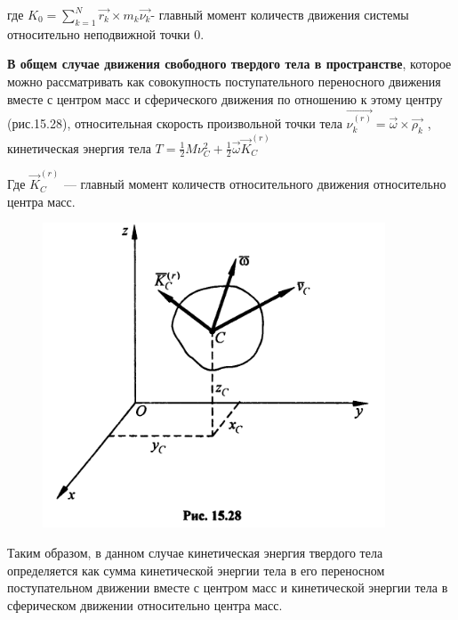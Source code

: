{\begin{center}
    \par где $ K_{0} = \sum_{k=1}^{N} \vec{r_{k}} \times m_{k}\vec{\nu_{k}}  $- главный момент количеств движения системы относительно неподвижной точки 0.

    \par \textbf {В  общем  случае  движения  свободного  твердого  тела  в  пространстве}, которое можно рассматривать как совокупность поступательного переносного движения вместе с центром масс и сферического движения по отношению к этому центру (рис.15.28), относительная скорость произвольной точки тела $\vec{\nu_{k}^{(r)}} = \vec{\omega} \times \vec{\rho_{k}} $ , кинетическая энергия тела $ T = \frac{1}{2}M\nu^{2}_{C} + \frac{1}{2} \vec{\omega}\vec{K}_{C}^{(r)}$
    \par Где ${ \vec{K}_{C}^{(r)} } $ — главный момент количеств относительного движения относительно центра масс.
    \begin{figure}[H]
    \centering\includegraphics[scale=0.5]{img/15.28.jpeg} 
    \end{figure}

    \par Таким  образом,  в  данном  случае  кинетическая  энергия  твердого  тела определяется как сумма кинетической энергии тела в его переносном поступательном движении вместе с центром масс и кинетической энергии тела в сферическом движении относительно центра масс.
\end{center}
}
